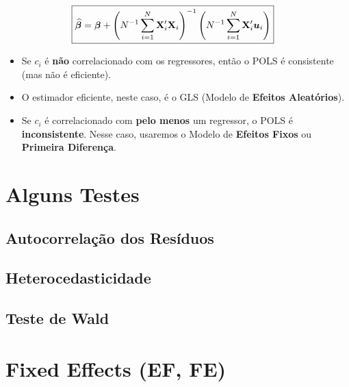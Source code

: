 \documentclass[11pt, oneside, a4paper, article]{article}
\numberwithin{equation}{section}
\begin{document}
\vspace{-1 em}
\begin{align*}
\Aboxed{
\betavechat
=&
\betavec
+
\left( N^{-1} \sum_{i=1}^{N} \Xmat_{i}' \Xmat_{i} \right)^{-1}
\left( N^{-1} \sum_{i=1}^{N} \Xmat_{i}' \uvec_{i} \right)  
}
\end{align*}


\begin{itemize}[noitemsep]
\item
Se $c_{i}$ é \textbf{não} correlacionado com os regressores, então o POLS é consistente (mas não é eficiente).
		
\item
	O estimador eficiente, neste caso, é o GLS (Modelo de \textbf{Efeitos Aleatórios}).

\item
	Se $c_{i}$ é correlacionado com \textbf{pelo menos} um regressor, o POLS é \textbf{inconsistente}.
	Nesse caso, usaremos o Modelo de \textbf{Efeitos Fixos} ou \textbf{Primeira Diferença}.
\end{itemize}

\section{Alguns Testes}

\subsection{Autocorrelação dos Resíduos}

\subsection{Heterocedasticidade}

\subsection{Teste de Wald}

\clearpage
\section{Fixed Effects (EF, FE)}
\begin{center}
\end{center}
\end{document}
